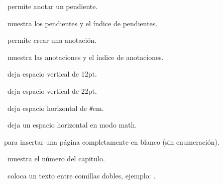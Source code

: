 

\pa\ permite anotar un pendiente.

\ muestra los pendientes y el índice de pendientes.


\pa\ permite crear una anotación.

\ muestra las anotaciones y el índice de anotaciones.


\ deja espacio vertical de 12pt.

\ deja espacio vertical de 22pt.

\pa[\#]\ deja espacio horizontal de \texttt{\#}em.

\ deja un espacio horizontal en modo math.

 para insertar una página completamente en blanco (sin enumeración).


\ muestra el número del capitulo.

\ coloca un texto entre comillas dobles, ejemplo: .
